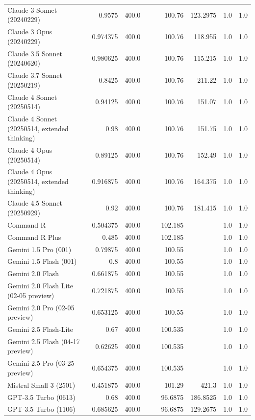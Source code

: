 \begin{table}[htp]
{\begin{tabular}{lrrrrrrrr}
Claude 3 Sonnet (20240229) & 0.9575 & 400.0 &  &  & 100.76 & 123.2975 & 1.0 & 1.0 \\
Claude 3 Opus (20240229) & 0.974375 & 400.0 &  &  & 100.76 & 118.955 & 1.0 & 1.0 \\
Claude 3.5 Sonnet (20240620) & 0.980625 & 400.0 &  &  & 100.76 & 115.215 & 1.0 & 1.0 \\
Claude 3.7 Sonnet (20250219) & 0.8425 & 400.0 &  &  & 100.76 & 211.22 & 1.0 & 1.0 \\
Claude 4 Sonnet (20250514) & 0.94125 & 400.0 &  &  & 100.76 & 151.07 & 1.0 & 1.0 \\
Claude 4 Sonnet (20250514, extended thinking) & 0.98 & 400.0 &  &  & 100.76 & 151.75 & 1.0 & 1.0 \\
Claude 4 Opus (20250514) & 0.89125 & 400.0 &  &  & 100.76 & 152.49 & 1.0 & 1.0 \\
Claude 4 Opus (20250514, extended thinking) & 0.916875 & 400.0 &  &  & 100.76 & 164.375 & 1.0 & 1.0 \\
Claude 4.5 Sonnet (20250929) & 0.92 & 400.0 &  &  & 100.76 & 181.415 & 1.0 & 1.0 \\
Command R & 0.504375 & 400.0 &  &  & 102.185 &  & 1.0 & 1.0 \\
Command R Plus & 0.485 & 400.0 &  &  & 102.185 &  & 1.0 & 1.0 \\
Gemini 1.5 Pro (001) & 0.79875 & 400.0 &  &  & 100.55 &  & 1.0 & 1.0 \\
Gemini 1.5 Flash (001) & 0.8 & 400.0 &  &  & 100.55 &  & 1.0 & 1.0 \\
Gemini 2.0 Flash & 0.661875 & 400.0 &  &  & 100.55 &  & 1.0 & 1.0 \\
Gemini 2.0 Flash Lite (02-05 preview) & 0.721875 & 400.0 &  &  & 100.55 &  & 1.0 & 1.0 \\
Gemini 2.0 Pro (02-05 preview) & 0.653125 & 400.0 &  &  & 100.55 &  & 1.0 & 1.0 \\
Gemini 2.5 Flash-Lite & 0.67 & 400.0 &  &  & 100.535 &  & 1.0 & 1.0 \\
Gemini 2.5 Flash (04-17 preview) & 0.62625 & 400.0 &  &  & 100.535 &  & 1.0 & 1.0 \\
Gemini 2.5 Pro (03-25 preview) & 0.654375 & 400.0 &  &  & 100.535 &  & 1.0 & 1.0 \\
Mistral Small 3 (2501) & 0.451875 & 400.0 &  &  & 101.29 & 421.3 & 1.0 & 1.0 \\
GPT-3.5 Turbo (0613) & 0.68 & 400.0 &  &  & 96.6875 & 186.8525 & 1.0 & 1.0 \\
GPT-3.5 Turbo (1106) & 0.685625 & 400.0 &  &  & 96.6875 & 129.2675 & 1.0 & 1.0 \\

\end{tabular}}
\end{table}
